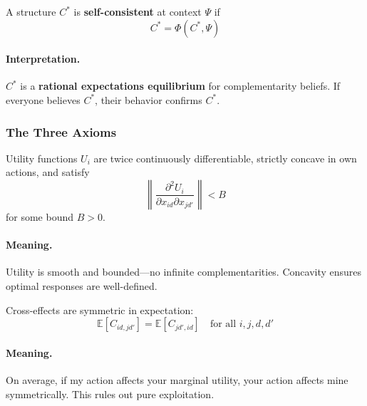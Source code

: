 \begin{definition}
\label{def:D-selfconsistent}
A structure $C^*$ is \textbf{self-consistent} at context $\Psi$ if
\begin{equation}
C^* = \Phi(C^*, \Psi)
\label{eq:D-fixedpoint}
\end{equation}
\end{definition}

\paragraph{Interpretation.}
$C^*$ is a \textbf{rational expectations equilibrium} for complementarity beliefs.
If everyone believes $C^*$, their behavior confirms $C^*$.

\subsubsection{The Three Axioms}

\begin{axiom}
\label{ax:D-regularity}
Utility functions $U_i$ are twice continuously differentiable,
strictly concave in own actions, and satisfy
\begin{equation}
\left\|\frac{\partial^2 U_i}{\partial x_{id} \partial x_{jd'}}\right\| < B
\end{equation}
for some bound $B > 0$.
\end{axiom}

\paragraph{Meaning.}
Utility is smooth and bounded---no infinite complementarities.
Concavity ensures optimal responses are well-defined.

\begin{axiom}
\label{ax:D-reciprocity}
Cross-effects are symmetric in expectation:
\begin{equation}
\mathbb{E}[C_{id,jd'}] = \mathbb{E}[C_{jd',id}]
\quad \text{for all } i,j,d,d'
\end{equation}
\end{axiom}

\paragraph{Meaning.}
On average, if my action affects your marginal utility,
your action affects mine symmetrically. This rules out pure exploitation.

